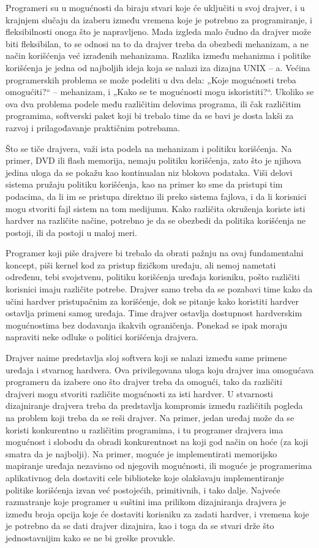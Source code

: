 \documentclass[a4paper, 12pt, diplomski]{etf}
\begin{document}
	Programeri su u mogućnosti da biraju stvari koje će uključiti u svoj dra\-jver, i u krajnjem slučaju da izaberu između vremena koje je potrebno za programiranje, i fleksibilnosti onoga što je napravljeno. Mada izgleda malo čudno da drajver može biti fleksibilan, to se odnosi na to da drajver treba da obezbedi mehanizam, a ne način korišćenja već izrađenih mehanizama. Razlika između mehanizma i politike korišćenja je jedna od najboljih ideja koja se nalazi iza dizajna UNIX – a. Većina programerskih problema se može podeliti u dva dela: „Koje mogućnosti treba omogućiti?“ – mehanizam, i „Kako se te mogućnosti mogu iskoristiti?“. Ukoliko se ova dva problema podele među različitim delovima programa, ili čak različitim programima, softverski paket koji bi trebalo time da se bavi je dosta lakši za razvoj i prilagođavanje praktičnim potrebama.

	Što se tiče drajvera, važi ista podela na mehanizam i politiku korišćenja. Na primer, DVD ili flash memorija, nemaju politiku korišćenja, zato što je njihova jedina uloga da se pokažu kao kontinualan niz blokova podataka. Viši delovi sistema pružaju politiku korišćenja, kao na primer ko sme da pristupi tim podacima, da li im se pristupa direktno ili preko sistema fajlova, i da li korisnici mogu stvoriti fajl sistem na tom medijumu. Kako različita okruženja koriste isti hardver na različite načine, potrebno je da se obezbedi da politika korišćenja ne postoji, ili da postoji u maloj meri.

	Programer koji piše drajvere bi trebalo da obrati pažnju na ovaj fundamentalni koncept, piši kernel kod za pristup fizičkom uređaju, ali nemoj nametati određenu, tebi svojstvenu, politiku korišćenja uređaja korisniku, pošto različiti korisnici imaju različite potrebe. Drajver samo treba da se pozabavi time kako da učini hardver pristupačnim za korišćenje, dok se pitanje kako koristiti hardver ostavlja primeni samog uređaja. Time drajver ostavlja dostupnost hardverskim mogućnostima bez dodavanja ikakvih ograničenja. Ponekad se ipak moraju napraviti neke odluke o politici korišćenja drajvera.

	Drajver naime predstavlja sloj softvera koji se nalazi između same primene uređaja i stvarnog hardvera. Ova privilegovana uloga koju drajver ima omogućava programeru da izabere ono što drajver treba da omogući, tako da različiti drajveri mogu stvoriti različite mogućnosti za isti hardver. U stvarnosti dizajniranje drajvera treba da predstavlja kompromis između različitih pogleda na problem koji treba da se reši drajver. Na primer, jedan uređaj može da se koristi konkurentno u različitim programima, i tu programer drajvera ima mogućnost i slobodu da obradi konkurentnost na koji god način on hoće (za koji smatra da je najbolji). Na primer, moguće je implementirati memorijsko mapiranje uređaja nezavisno od njegovih mogućnosti, ili moguće je programerima aplikativnog dela dostaviti cele biblioteke koje olakšavaju implementiranje politike korišćenja izvan već postojećih, primitivnih, i tako dalje. Najveće razmatranje koje programer u suštini ima prilikom dizajniranja drajvera je između broja opcija koje će dostaviti korisniku za zadati hardver, i vremena koje je potrebno da se dati drajver dizajnira, kao i toga da se stvari drže što jednostavnijim kako se ne bi greške provukle.
\end{document}
